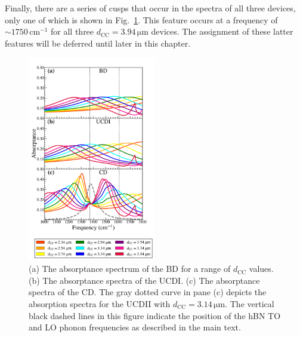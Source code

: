 \documentclass[preprint,
amsmath,amssymb,
aip,
jap,
floatfix,]{revtex4-2}
\begin{document}
			Finally, there are a series of cusps that occur in the spectra of all three devices, only one of which is shown in Fig.~\ref{fig:3.7}. This feature occurs at a frequency of $\sim 1750\,\mathrm{cm}^{-1}$ for all three $d_\mathrm{CC} = 3.94\,\si{\um}$ devices. The assignment of these latter features will be deferred until later in this chapter.

			\begin{figure}[!htb]
			  \centering\includegraphics[width=0.5\textwidth]{Figures/Fig2.pdf}
			  \caption{(a) The absorptance spectrum of the BD for a range of $d_\mathrm{CC}$ values. (b) The absorptance spectra of the UCDI. (c) The absorptance spectra of the CD. The gray dotted curve in pane (c) depicts the absorption spectra for the UCDII with $d_\mathrm{CC} = 3.14\,\si{\um}$.  The vertical black dashed lines in this figure indicate the position of the hBN TO and LO phonon frequencies as described in the main text.}
			  \label{fig:3.7}
			\end{figure}
\end{document}
